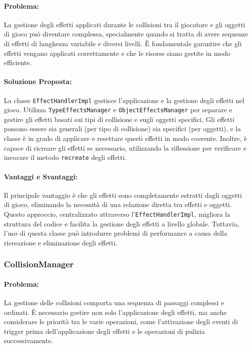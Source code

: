 \documentclass[a4paper,12pt]{report}
\begin{document}
\paragraph{Problema:} La gestione degli effetti applicati durante le collisioni tra il giocatore e gli oggetti di gioco può diventare complessa, specialmente quando si tratta di avere sequenze di effetti di lunghezza variabile e diversi livelli. È fondamentale garantire che gli effetti vengano applicati correttamente e che le risorse siano gestite in modo efficiente.

\paragraph{Soluzione Proposta:} La classe \texttt{EffectHandlerImpl} gestisce l’applicazione e la gestione degli effetti nel gioco. Utilizza \texttt{TypeEffectsManager} e \texttt{ObjectEffectsManager} per separare e gestire gli effetti basati sui tipi di collisione e sugli oggetti specifici. Gli effetti possono essere sia generali (per tipo di collisione) sia specifici (per oggetti), e la classe è in grado di applicare e resettare questi effetti in modo coerente. Inoltre, è capace di ricreare gli effetti se necessario, utilizzando la riflessione per verificare e invocare il metodo \texttt{recreate} degli effetti.

\paragraph{Vantaggi e Svantaggi:}
Il principale vantaggio è che gli effetti sono completamente estratti dagli oggetti di gioco, eliminando la necessità di una relazione diretta tra effetti e oggetti. Questo approccio, centralizzato attraverso l’\texttt{EffectHandlerImpl}, migliora la struttura del codice e facilita la gestione degli effetti a livello globale. Tuttavia, l’uso di questa classe può introdurre problemi di performance a causa della ricreazione e eliminazione degli effetti.

\subsubsection{CollisionManager}

\paragraph{Problema:} La gestione delle collisioni comporta una sequenza di passaggi complessi e ordinati. È necessario gestire non solo l’applicazione degli effetti, ma anche considerare le priorità tra le varie operazioni, come l’attivazione degli eventi di trigger prima dell’applicazione degli effetti e le operazioni di pulizia successivamente. 
\end{document}
